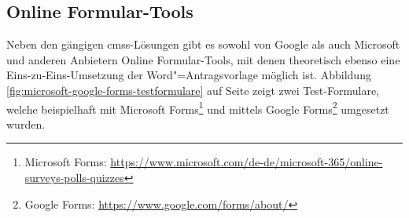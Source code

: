 \documentclass[a4paper,12pt,twoside,numbers=noendperiod]{scrreprt}
\begin{document}
\subsection{Online Formular-Tools}
\label{sub-sec:formular-tools}

Neben den gängigen \acp{cms}-Lösungen gibt es sowohl von Google als auch Microsoft und anderen Anbietern Online Formular-Tools, mit denen theoretisch ebenso eine Eins-zu-Eins-Umsetzung der Word"=Antragsvorlage möglich ist. Abbildung \ref{fig:microsoft-google-forms-testformulare} auf Seite \pageref{fig:microsoft-google-forms-testformulare} zeigt zwei Test-Formulare, welche beispielhaft mit Microsoft Forms\footnote{Microsoft Forms: \url{https://www.microsoft.com/de-de/microsoft-365/online-surveys-polls-quizzes}} und mittels Google Forms\footnote{Google Forms: \url{https://www.google.com/forms/about/}} umgesetzt wurden.
\end{document}

